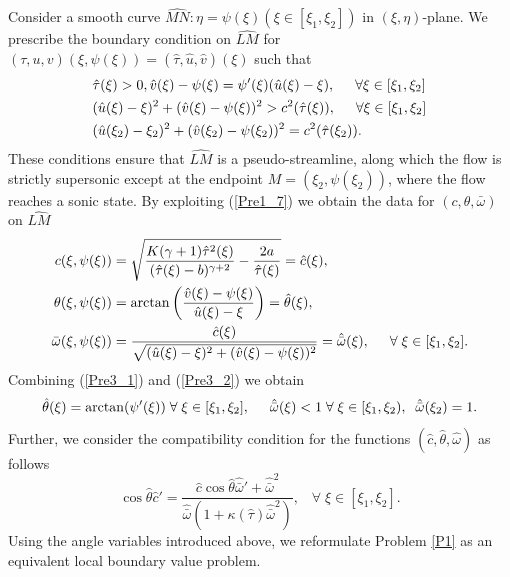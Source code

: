 \documentclass[3p,11pt]{elsarticle}
\numberwithin{equation}{section}
\begin{document}
Consider a smooth curve $\widehat{MN}: \eta=\psi(\xi)(\xi \in[\xi_1,\xi_2])$ in $(\xi,\eta)$-plane. We prescribe the boundary condition on $\widehat{LM}$ for $(\tau,u,v)(\xi,\psi(\xi))=(\hat\tau,\hat u,\hat v)(\xi)$ such that
\begin{equation}\label{Pre3_1}
    \begin{split}
        & \hat\tau(\xi)>0, \hat v(\xi)-\psi(\xi)=\psi'(\xi)(\hat u(\xi)-\xi), \hspace{5mm} \forall \xi \in [\xi_1,\xi_2]\\
        & (\hat u(\xi)-\xi)^2+(\hat v(\xi)-\psi(\xi))^2> c^2(\hat\tau(\xi)) ,\hspace{5mm} \forall \xi \in [\xi_1,\xi_2]\\
        & (\hat u(\xi_2)-\xi_2)^2+(\hat v(\xi_2)-\psi(\xi_2))^2= c^2(\hat\tau(\xi_2)).
    \end{split}
\end{equation} 
These conditions ensure that $\widehat{LM}$ is a pseudo-streamline, along which the flow is strictly supersonic except at the endpoint $M=(\xi_2,\psi(\xi_2))$, where the flow reaches a sonic state. By exploiting (\ref{Pre1_7}) we obtain the data for $(c,\theta,\bar\omega)$ on $\widehat{LM}$
\begin{equation}\label{Pre3_2}
   \begin{split}
        c(\xi,\psi(\xi))&=\sqrt{\frac{K(\gamma+1)\hat\tau^2(\xi)}{(\hat\tau(\xi)-b)^{\gamma+2}}-\frac{2a}{\hat\tau(\xi)}}= \hat c(\xi),\\
        \theta(\xi,\psi(\xi))&=\arctan\left(\frac{\hat v(\xi)-\psi(\xi)}{\hat u(\xi)-\xi} \right)=\hat\theta(\xi), \\
        \bar\omega(\xi,\psi(\xi))&=\frac{\hat c(\xi)}{\sqrt{(\hat u(\xi)-\xi)^2+(\hat v(\xi)-\psi(\xi))^2}} =\hat{\bar\omega}(\xi), \hspace{5mm} \forall \; \xi\in[\xi_1,\xi_2].
   \end{split}
\end{equation}
Combining (\ref{Pre3_1}) and (\ref{Pre3_2}) we obtain
\begin{equation}\label{Pre3_3}
    \hat\theta(\xi)=\arctan( \psi'(\xi))\; \forall\; \xi\in[\xi_1,\xi_2], \hspace{5mm} \hat{\bar\omega}(\xi)<1 \; \forall \;\xi\in[\xi_1,\xi_2), \; \; \hat{\bar\omega}(\xi_2)=1.
\end{equation}
Further, we consider the compatibility condition for the functions $(\hat c, \hat\theta,\hat\omega)$ as follows
\begin{equation}\label{Pre3_4}  
    \cos\hat\theta \hat c'=\frac{\hat c\cos\hat\theta\hat{\bar\omega}'+\hat{\bar\omega}^2}{{\hat{\bar\omega}}(1+\kappa(\hat\tau){\hat{\bar\omega}^2})}, \;\;\; \forall \; \xi\in[\xi_1,\xi_2].
\end{equation}
Using the angle variables introduced above, we reformulate Problem \ref{P1} as an equivalent local boundary value problem.
\end{document}
